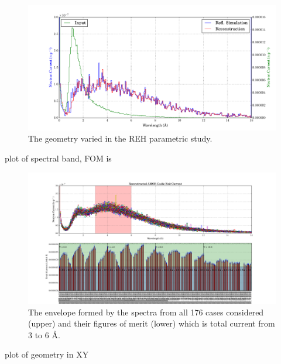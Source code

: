 \documentclass[a4paper]{jpconf}
\begin{document}
\begin{figure}
\begin{center}
\includegraphics[scale=0.4]{graphics/xfer_bench.pdf}
\end{center}
\caption{\label{parametric_geom}The geometry varied in the REH parametric study.}
\end{figure}


plot of spectral band, FOM is

\begin{figure}
\begin{center}
\includegraphics[scale=0.38,trim={1cm 2.35cm 1cm 0cm},clip]{graphics/parametric_REH.pdf}
\end{center}
\caption{\label{parametric_REH}The envelope formed by the spectra from all 176 cases considered (upper) and their figures of merit (lower) which is total current from 3 to 6 \AA.}
\end{figure}


plot of geometry in XY
\end{document}
